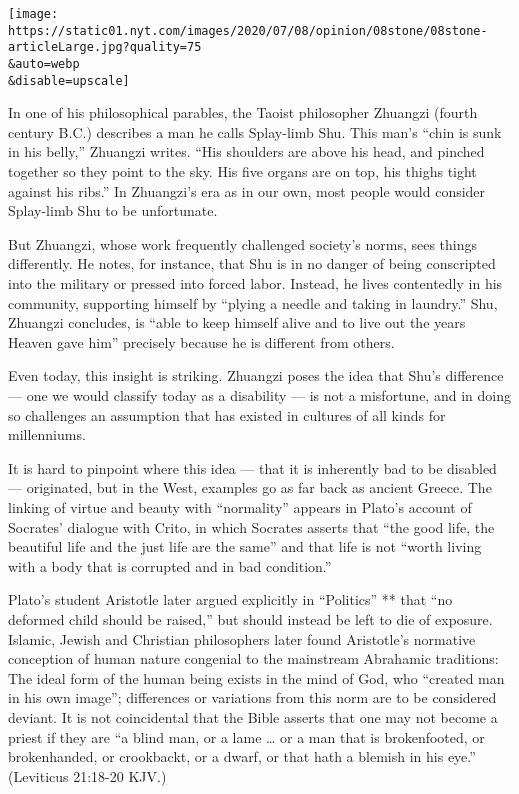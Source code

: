 \texttt{[image: https://static01.nyt.com/images/2020/07/08/opinion/08stone/08stone-articleLarge.jpg?quality=75\\\&auto=webp\\\&disable=upscale]}

In one of his philosophical parables, the Taoist philosopher Zhuangzi
(fourth century B.C.) describes a man he calls Splay-limb Shu. This
man's ``chin is sunk in his belly,'' Zhuangzi writes. ``His shoulders
are above his head, and pinched together so they point to the sky. His
five organs are on top, his thighs tight against his ribs.'' In
Zhuangzi's era as in our own, most people would consider Splay-limb Shu
to be unfortunate.

But Zhuangzi, whose work frequently challenged society's norms, sees
things differently. He notes, for instance, that Shu is in no danger of
being conscripted into the military or pressed into forced labor.
Instead, he lives contentedly in his community, supporting himself by
``plying a needle and taking in laundry.'' Shu, Zhuangzi concludes, is
``able to keep himself alive and to live out the years Heaven gave him''
precisely because he is different from others.

Even today, this insight is striking. Zhuangzi poses the idea that Shu's
difference --- one we would classify today as a disability --- is not a
misfortune, and in doing so challenges an assumption that has existed in
cultures of all kinds for millenniums.

It is hard to pinpoint where this idea --- that it is inherently bad to
be disabled --- originated, but in the West, examples go as far back as
ancient Greece. The linking of virtue and beauty with ``normality''
appears in Plato's account of Socrates' dialogue with Crito, in which
Socrates asserts that ``the good life, the beautiful life and the just
life are the same'' and that life is not ``worth living with a body that
is corrupted and in bad condition.''

Plato's student Aristotle later argued explicitly in ``Politics'' **
that ``no deformed child should be raised,'' but should instead be left
to die of exposure. Islamic, Jewish and Christian philosophers later
found Aristotle's normative conception of human nature congenial to the
mainstream Abrahamic traditions: The ideal form of the human being
exists in the mind of God, who ``created man in his own image'';
differences or variations from this norm are to be considered deviant.
It is not coincidental that the Bible asserts that one may not become a
priest if they are ``a blind man, or a lame \ldots{} or a man that is
brokenfooted, or brokenhanded, or crookbackt, or a dwarf, or that hath a
blemish in his eye.'' (Leviticus 21:18-20 KJV.)

